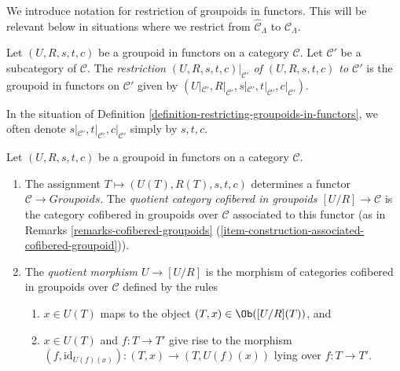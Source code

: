 \noindent
We introduce notation for restriction of groupoids in functors. This will be
relevant below in situations where we restrict from $\widehat{\mathcal
C}_\Lambda$ to $\mathcal{C}_\Lambda$.

\begin{definition}
\label{definition-restricting-groupoids-in-functors}
Let $(U, R, s, t, c)$ be a groupoid in functors on a category $\mathcal{C}$.
Let $\mathcal{C}'$ be a subcategory of $\mathcal{C}$. The
{\it restriction $(U, R, s, t, c)|_{\mathcal{C}'}$ of $(U, R, s, t, c)$
to $\mathcal{C}'$} is the groupoid
in functors on $\mathcal{C}'$ given by $(U|_{\mathcal{C}'}, R|_{\mathcal
C'}, s|_{\mathcal{C}'}, t|_{\mathcal{C}'}, c|_{\mathcal{C}'})$.
\end{definition}

\begin{remark}
\label{remark-notation-restriction}
In the situation of Definition
\ref{definition-restricting-groupoids-in-functors}, we often denote
$s|_{\mathcal{C}'}, t|_{\mathcal{C}'}, c|_{\mathcal{C}'}$ simply by $s, t, c$.
\end{remark}

\begin{definition}
\label{definition-quotient}
Let $(U, R, s, t, c)$ be a groupoid in functors on a category $\mathcal{C}$.
\begin{enumerate}
\item The assignment $T \mapsto  (U(T), R(T), s, t, c)$ determines a functor
$\mathcal{C} \to \textit{Groupoids}$. The {\it quotient category
cofibered in groupoids $[U/R] \to \mathcal{C}$} is the category
cofibered in groupoids over $\mathcal{C}$ associated to this functor (as in
Remarks \ref{remarks-cofibered-groupoids}
(\ref{item-construction-associated-cofibered-groupoid})).
\item The {\it quotient morphism $U \to [U/R]$} is the morphism of
categories cofibered in groupoids over $\mathcal{C}$ defined by the
rules
\begin{enumerate}
\item $x \in U(T)$ maps to the object $(T, x) \in \Ob([U/R](T))$, and
\item $x \in U(T)$ and $f : T \to T'$ give rise to the morphism
$(f, \text{id}_{U(f)(x)}): (T, x) \to (T, U(f)(x))$ lying over
$f : T \to T'$.
\end{enumerate}
\end{enumerate}
\end{definition}





